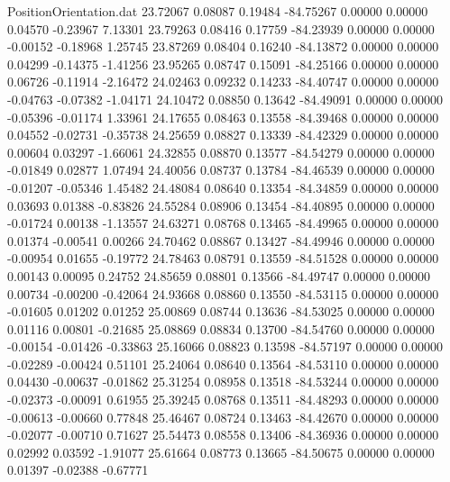 \begin{filecontents}{PositionOrientation.dat}
  23.72067    0.08087    0.19484   -84.75267    0.00000    0.00000    0.04570   -0.23967    7.13301
  23.79263    0.08416    0.17759   -84.23939    0.00000    0.00000   -0.00152   -0.18968    1.25745
  23.87269    0.08404    0.16240   -84.13872    0.00000    0.00000    0.04299   -0.14375   -1.41256
  23.95265    0.08747    0.15091   -84.25166    0.00000    0.00000    0.06726   -0.11914   -2.16472
  24.02463    0.09232    0.14233   -84.40747    0.00000    0.00000   -0.04763   -0.07382   -1.04171
  24.10472    0.08850    0.13642   -84.49091    0.00000    0.00000   -0.05396   -0.01174    1.33961
  24.17655    0.08463    0.13558   -84.39468    0.00000    0.00000    0.04552   -0.02731   -0.35738
  24.25659    0.08827    0.13339   -84.42329    0.00000    0.00000    0.00604    0.03297   -1.66061
  24.32855    0.08870    0.13577   -84.54279    0.00000    0.00000   -0.01849    0.02877    1.07494
  24.40056    0.08737    0.13784   -84.46539    0.00000    0.00000   -0.01207   -0.05346    1.45482
  24.48084    0.08640    0.13354   -84.34859    0.00000    0.00000    0.03693    0.01388   -0.83826
  24.55284    0.08906    0.13454   -84.40895    0.00000    0.00000   -0.01724    0.00138   -1.13557
  24.63271    0.08768    0.13465   -84.49965    0.00000    0.00000    0.01374   -0.00541    0.00266
  24.70462    0.08867    0.13427   -84.49946    0.00000    0.00000   -0.00954    0.01655   -0.19772
  24.78463    0.08791    0.13559   -84.51528    0.00000    0.00000    0.00143    0.00095    0.24752
  24.85659    0.08801    0.13566   -84.49747    0.00000    0.00000    0.00734   -0.00200   -0.42064
  24.93668    0.08860    0.13550   -84.53115    0.00000    0.00000   -0.01605    0.01202    0.01252
  25.00869    0.08744    0.13636   -84.53025    0.00000    0.00000    0.01116    0.00801   -0.21685
  25.08869    0.08834    0.13700   -84.54760    0.00000    0.00000   -0.00154   -0.01426   -0.33863
  25.16066    0.08823    0.13598   -84.57197    0.00000    0.00000   -0.02289   -0.00424    0.51101
  25.24064    0.08640    0.13564   -84.53110    0.00000    0.00000    0.04430   -0.00637   -0.01862
  25.31254    0.08958    0.13518   -84.53244    0.00000    0.00000   -0.02373   -0.00091    0.61955
  25.39245    0.08768    0.13511   -84.48293    0.00000    0.00000   -0.00613   -0.00660    0.77848
  25.46467    0.08724    0.13463   -84.42670    0.00000    0.00000   -0.02077   -0.00710    0.71627
  25.54473    0.08558    0.13406   -84.36936    0.00000    0.00000    0.02992    0.03592   -1.91077
  25.61664    0.08773    0.13665   -84.50675    0.00000    0.00000    0.01397   -0.02388   -0.67771

\end{filecontents}
